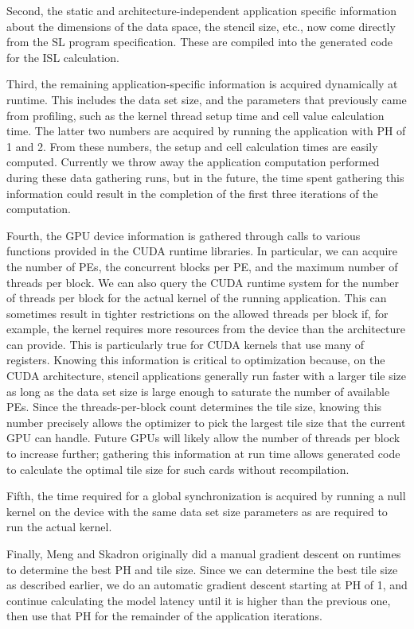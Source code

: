 \documentclass{sig-alternate}
\begin{document}
Second, the static and architecture-independent application specific
information about the dimensions of the data space, the stencil size, etc.,
now come directly from the SL program specification.  These are compiled into
the generated code for the ISL calculation.

Third, the remaining application-specific information is acquired dynamically
at runtime.  This includes the data set size, and the parameters that
previously came from profiling, such as the kernel thread setup time and cell
value calculation time.  The latter two numbers are acquired by running the
application with PH of 1 and 2. From these numbers, the setup and cell
calculation times are easily computed.  Currently we throw away the
application computation performed during these data gathering runs, but in
the future, the time spent gathering this information could result in the
completion of the first three iterations of the computation.

Fourth, the GPU device information is gathered through calls to various
functions provided in the CUDA runtime libraries.  In particular, we can
acquire the number of PEs, the concurrent blocks per PE, and the maximum
number of threads per block.  We can also query the CUDA runtime system for
the number of threads per block for the actual kernel of the running
application.  This can sometimes result in tighter restrictions on the
allowed threads per block if, for example, the kernel requires more resources
from the device than the architecture can provide.  This is particularly true
for CUDA kernels that use many of registers.  Knowing this information is
critical to optimization because, on the CUDA architecture, stencil
applications generally run faster with a larger tile size as long as the data
set size is large enough to saturate the number of available PEs.  Since the
threads-per-block count determines the tile size, knowing this number
precisely allows the optimizer to pick the largest tile size that the current
GPU can handle.  Future GPUs will likely allow the number of threads per
block to increase further; gathering this information at run time allows
generated code to calculate the optimal tile size for such cards without
recompilation.

Fifth, the time required for a global synchronization is acquired by running
a null kernel on the device with the same data set size parameters as are
required to run the actual kernel.

Finally, Meng and Skadron originally did a manual gradient descent on
runtimes to determine the best PH and tile size.  Since we can determine the
best tile size as described earlier, we do an automatic gradient descent
starting at PH of 1, and continue calculating the model latency until it is
higher than the previous one, then use that PH for the remainder of the
application iterations.
\end{document}
